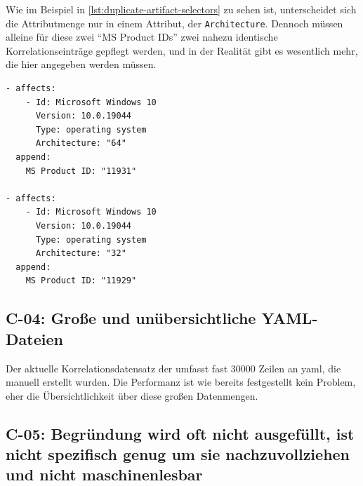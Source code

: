 Wie im Beispiel in \autoref{lst:duplicate-artifact-selectors} zu sehen ist, unterscheidet sich die Attributmenge nur in einem Attribut, der \texttt{Architecture}.
Dennoch müssen alleine für diese zwei \enquote{MS Product IDs} zwei nahezu identische Korrelationseinträge gepflegt werden, und in der Realität gibt es wesentlich mehr, die hier angegeben werden müssen.

\begin{lstlisting}[style=yaml,caption={Zwei Korrelationseinträge mit nahezu identischen Attributen},label={lst:duplicate-artifact-selectors}]
- affects:
    - Id: Microsoft Windows 10
      Version: 10.0.19044
      Type: operating system
      Architecture: "64"
  append:
    MS Product ID: "11931"

- affects:
    - Id: Microsoft Windows 10
      Version: 10.0.19044
      Type: operating system
      Architecture: "32"
  append:
    MS Product ID: "11929"
\end{lstlisting}

\subsection{C-04: Große und unübersichtliche YAML-Dateien}\label{subsec:c-04-groe-und-unubersichtliche-yaml-dateien}


Der aktuelle Korrelationsdatensatz der \metaeffektsp umfasst fast 30000 Zeilen an \acrshort{yaml}, die manuell erstellt wurden.
Die Performanz ist wie bereits festgestellt kein Problem, eher die Übersichtlichkeit über diese großen Datenmengen.

\subsection{C-05: Begründung wird oft nicht ausgefüllt, ist nicht spezifisch genug um sie nachzuvollziehen und nicht maschinenlesbar}\label{subsec:c-05-reason-not-good-enough}

